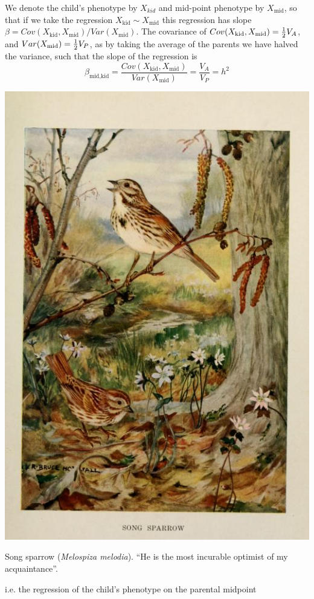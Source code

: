 We denote the child's phenotype by $X_{kid}$ and mid-point
phenotype by $X_{\textrm{mid}}$, so that if we take the regression $X_{\textrm{kid}} \sim X_{\textrm{mid}}$ this
regression has slope $\beta = Cov(X_{\textrm{kid}},X_{\textrm{mid}})/Var(X_{\textrm{mid}})$.
The covariance of $Cov(X_{\textrm{kid}},X_{\textrm{mid}})=\tfrac{1}{2}
V_A$, and $Var(X_{\textrm{mid}}) = \tfrac{1}{2} V_P$, as by taking the average of the
parents we have halved the variance, such that the slope of the
regression is
\begin{equation}
\beta_{\textrm{mid}, \textrm{kid}}=
\frac{Cov(X_{\textrm{kid}},X_{\textrm{mid}})}{Var(X_{\textrm{mid}})}=
\frac{V_A}{V_P} = h^2 \label{eqn:par_off_herit}
\end{equation}
\begin{marginfigure}
\begin{center}
\includegraphics[width=\textwidth]{illustration_images/Quant_gen/song_sparrow/birdbiographies00ball_0165.jpg}
\end{center}
\caption{Song sparrow ({\it Melospiza melodia}). ``He is the most
  incurable optimist of my acquaintance''.
} \label{fig:song_sparrow}
\end{marginfigure} i.e. the regression of the child's phenotype on the parental midpoint
